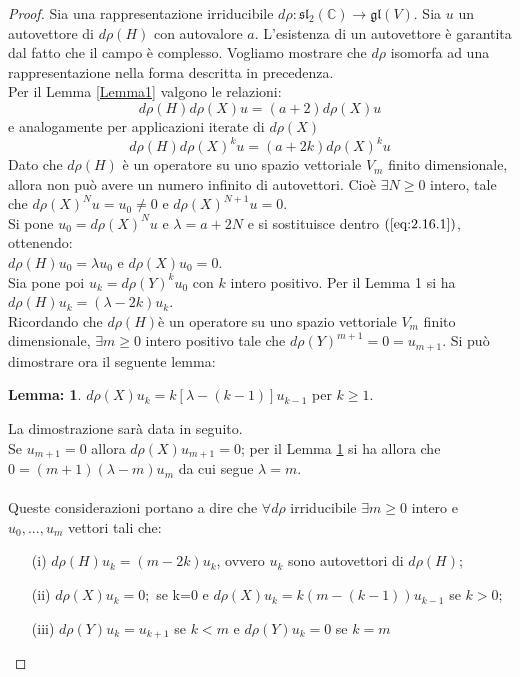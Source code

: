 \documentclass[12pt,a4paper]{report}
\theoremstyle{definition}
\theoremstyle{definition}
\theoremstyle{definition}
\newtheorem{Lem}[Def]{Lemma:}
\theoremstyle{remark}
\begin{document}
\begin{proof}
	Sia una rappresentazione irriducibile $d\rho:\mathfrak{sl_2(\mathbb{C})}\rightarrow \mathfrak{gl}(V)$. Sia $u$ un autovettore di $d\rho(H)$ con autovalore $a$. L'esistenza di un autovettore è garantita dal fatto che il campo è complesso. Vogliamo mostrare che $d\rho$ isomorfa ad una rappresentazione nella forma descritta in precedenza.\\
	Per il Lemma \ref{Lemma1} valgono le relazioni: $$d\rho(H)d\rho(X)u=(a+2)d\rho(X)u$$ e analogamente per applicazioni iterate di $d\rho(X)$
	\begin{equation}
		\label{eq:2.16.1}
		d\rho(H)d\rho(X)^ku=(a+2k)d\rho(X)^ku
		\tag{1}
	\end{equation}
	Dato che $d\rho(H)$ è un operatore su uno spazio vettoriale $V_m$ finito dimensionale, allora non può avere un numero infinito di autovettori. Cioè $\exists N\geq 0$ intero, tale che $d\rho(X)^Nu=u_0\neq0$ e $d\rho(X)^{N+1}u=0$.\\
	Si pone $u_0=d\rho(X)^Nu$ e $\lambda=a+2N$ e si sostituisce dentro $(\ref{eq:2.16.1})$, ottenendo:\\  $d\rho(H)u_0=\lambda u_0$ e $d\rho(X)u_0=0$.	\\
	Sia pone poi $u_k=d\rho(Y)^ku_0$ con $k$ intero positivo. Per il Lemma 1 si ha $d\rho(H)u_k=(\lambda-2k)u_k$.\\
	Ricordando che $d\rho(H)$è un operatore su uno spazio vettoriale $V_m$ finito dimensionale, $\exists m\geq0$ intero positivo tale che  $d\rho(Y)^{m+1}=0=u_{m+1}$. Si può dimostrare ora il seguente lemma:
	\begin{Lem}\label{Lemma2}
		$d\rho(X)u_k=k[\lambda-(k-1)]u_{k-1}$ per $k\geq 1$.
	\end{Lem} 
La dimostrazione sarà data in seguito.
\\Se $u_{m+1}=0$ allora $d\rho(X)u_{m+1}=0$; per il Lemma \ref{Lemma2} si ha allora che $0=(m+1)(\lambda-m)u_m$ da cui segue $\lambda=m$.\\
\\
	Queste considerazioni portano a dire che $\forall d\rho $ irriducibile $\exists m\geq0$ intero e $u_0,...,u_m$ vettori tali che:\begin{itemize}
		\item[(i)] $d\rho(H)u_k=(m-2k)u_k$, ovvero $u_k$ sono autovettori di $d\rho(H)$;
		\item[(ii)] $d\rho(X)u_k=0;$ se k=0 e $d\rho(X)u_k=k(m-(k-1))u_{k-1}$ se $k>0$;
		\item[(iii)] $d\rho(Y)u_k=u_{k+1}$ se $k<m$ e $d\rho(Y)u_k=0$ se $k=m$

\end{itemize}
\end{proof}
\end{document}
